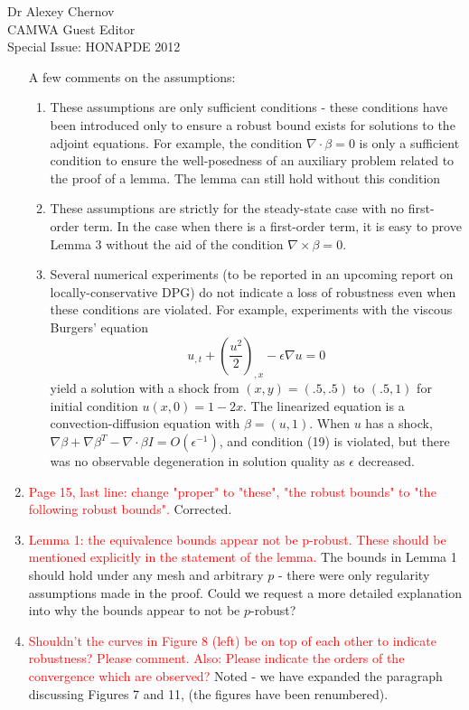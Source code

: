 \documentclass{letter}
\newcommand{\LRp}[1]{\left( #1 \right)}
\newcommand{\grad}{\nabla}
\newcommand{\curl}{\grad \times}
\renewcommand{\div}{\grad \cdot}
\begin{document}
\begin{letter}{Dr Alexey Chernov\\CAMWA Guest Editor\\Special Issue: HONAPDE 2012}
\begin{enumerate}
A few comments on the assumptions: 
\begin{enumerate}
\item These assumptions are only sufficient conditions - these conditions have been introduced only to ensure a robust bound exists for solutions to the adjoint equations.  For example, the condition $\div \beta = 0$ is only a sufficient condition to ensure the well-posedness of an auxiliary problem related to the proof of a lemma.  The lemma can still hold without this condition
\item These assumptions are strictly for the steady-state case with no first-order term.  In the case when there is a first-order term, it is easy to prove Lemma 3 without the aid of the condition $\curl \beta = 0$.  
\item Several numerical experiments (to be reported in an upcoming report on locally-conservative DPG) do not indicate a loss of robustness even when these conditions are violated.  For example, experiments with the viscous Burgers' equation 
\[
u_{,t} + \LRp{\frac{u^2}{2}}_{,x} - \epsilon \nabla u = 0
\]
yield a solution with a shock from $(x,y) = (.5,.5)$ to $(.5,1)$ for initial condition $u(x,0) = 1-2x$.  The linearized equation is a convection-diffusion equation with $\beta = (u,1)$.  When $u$ has a shock, $\grad \beta + \grad \beta^T - \div \beta I = O(\epsilon^{-1})$, and condition (19) is violated, but there was no observable degeneration in solution quality as $\epsilon$ decreased.  
\end{enumerate}

\item \textcolor{red}{Page 15, last line: change "proper" to "these", "the robust bounds" to "the following robust bounds".}  Corrected.

\item \textcolor{red}{Lemma 1: the equivalence bounds appear not be p-robust. These should be mentioned explicitly in the statement of the lemma.}  The bounds in Lemma 1 should hold under any mesh and arbitrary $p$ - there were only regularity assumptions made in the proof.  Could we request a more detailed explanation into why the bounds appear to not be $p$-robust?

\item \textcolor{red}{Shouldn't the curves in Figure 8 (left) be on top of each other to indicate robustness? Please comment. Also: Please indicate the orders of the convergence which are observed?} Noted - we have expanded the paragraph discussing Figures 7 and 11, (the figures have been renumbered).  


\end{enumerate}
\end{letter}
\end{document}
